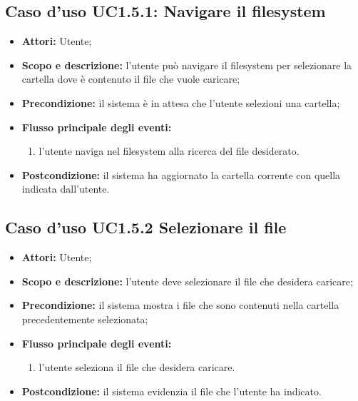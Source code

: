 \subsection{Caso d'uso UC1.5.1: Navigare il filesystem}
\begin{itemize}
\item \textbf{Attori:} Utente;
\item \textbf{Scopo e descrizione:} l'utente può navigare il filesystem per selezionare la cartella dove è contenuto il file che vuole caricare;
\item \textbf{Precondizione:} il sistema è in attesa che l'utente selezioni una cartella;
\item \textbf{Flusso principale degli eventi:}
\begin{enumerate}
\item l'utente naviga nel filesystem alla ricerca del file desiderato.
\end{enumerate}
\item \textbf{Postcondizione:} il sistema ha aggiornato la cartella corrente con quella indicata dall'utente.
\end{itemize}

\subsection{Caso d'uso UC1.5.2 Selezionare il file}
\begin{itemize}
\item \textbf{Attori:} Utente;
\item \textbf{Scopo e descrizione:} l'utente deve selezionare il file che desidera caricare;
\item \textbf{Precondizione:} il sistema mostra i file che sono contenuti nella cartella precedentemente selezionata;
\item \textbf{Flusso principale degli eventi:}
\begin{enumerate}
\item l'utente seleziona il file che desidera caricare.
\end{enumerate}
\item \textbf{Postcondizione:} il sistema evidenzia il file che l'utente ha indicato.
\end{itemize}

